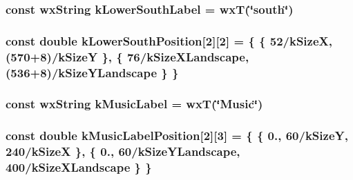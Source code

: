 \hypertarget{a00222_a985ac3dc5c3b5eb6c3fe605a9e296023}{
\subsubsection[{k\-Lower\-South\-Label}]{\setlength{\rightskip}{0pt plus 5cm}const wx\-String k\-Lower\-South\-Label = wx\-T(\char`\"{}south\char`\"{})\hspace{0.3cm}{\ttfamily [static]}}}\label{a00222_a985ac3dc5c3b5eb6c3fe605a9e296023}
\hypertarget{a00222_aa830d06b1305973520c2be2d713d4ce4}{
\subsubsection[{k\-Lower\-South\-Position}]{\setlength{\rightskip}{0pt plus 5cm}const double k\-Lower\-South\-Position\mbox{[}2\mbox{]}\mbox{[}2\mbox{]} = \{ \{ 52/{\bf k\-Size\-X}, (570+8)/{\bf k\-Size\-Y} \}, \{ 76/{\bf k\-Size\-X\-Landscape}, (536+8)/{\bf k\-Size\-Y\-Landscape} \} \}\hspace{0.3cm}{\ttfamily [static]}}}\label{a00222_aa830d06b1305973520c2be2d713d4ce4}
\hypertarget{a00222_a652746985359ab0e9a3a6399cf13f3ac}{
\subsubsection[{k\-Music\-Label}]{\setlength{\rightskip}{0pt plus 5cm}const wx\-String k\-Music\-Label = wx\-T(\char`\"{}Music\char`\"{})\hspace{0.3cm}{\ttfamily [static]}}}\label{a00222_a652746985359ab0e9a3a6399cf13f3ac}
\hypertarget{a00222_a8ded16e9b3dd1bb8591f298d6e24a6ec}{
\subsubsection[{k\-Music\-Label\-Position}]{\setlength{\rightskip}{0pt plus 5cm}const double k\-Music\-Label\-Position\mbox{[}2\mbox{]}\mbox{[}3\mbox{]} = \{ \{ 0., 60/{\bf k\-Size\-Y}, 240/{\bf k\-Size\-X} \}, \{ 0., 60/{\bf k\-Size\-Y\-Landscape}, 400/{\bf k\-Size\-X\-Landscape} \} \}\hspace{0.3cm}{\ttfamily [static]}}}\label{a00222_a8ded16e9b3dd1bb8591f298d6e24a6ec}
